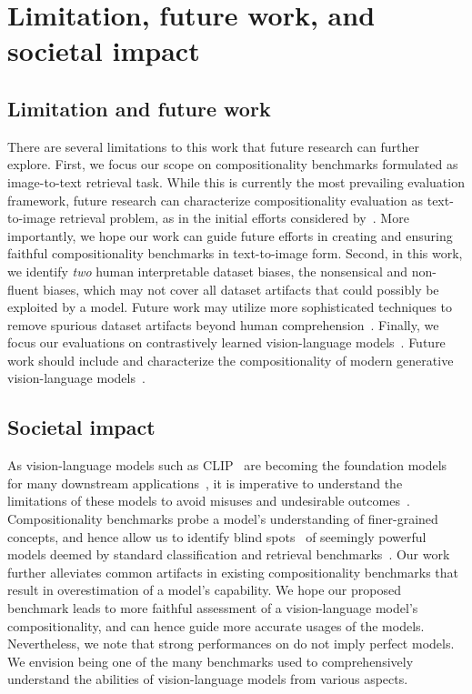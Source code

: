 \section{Limitation, future work, and societal impact}

\subsection{Limitation and future work}
There are several limitations to this work that future research can further explore. First, we focus our scope on compositionality benchmarks formulated as image-to-text retrieval task. While this is currently the most prevailing evaluation framework, future research can characterize compositionality evaluation as text-to-image retrieval problem, as in the initial efforts considered by~\cite{ray2023cola,thrush2022winoground}. More importantly, we hope our work can guide future efforts in creating and ensuring faithful compositionality benchmarks in text-to-image form.
Second, in this work, we identify \emph{two} human interpretable dataset biases, the nonsensical and non-fluent biases, which may not cover all dataset artifacts that could possibly be exploited by a model. Future work may utilize more sophisticated techniques to remove spurious dataset artifacts beyond human comprehension~\cite{le2020adversarial}.
Finally, we focus our evaluations on contrastively learned vision-language models~\cite{RadfordKHRGASAM21}. Future work should include and characterize the compositionality of modern generative vision-language models~\cite{alayrac2022flamingo,chen2022pali,li2023blip2,tschannen2023image}.


\subsection{Societal impact}
As vision-language models such as CLIP~\cite{RadfordKHRGASAM21} are becoming the foundation models for many downstream applications~\cite{rombach2022high,ramesh2022hierarchical}, it is imperative to understand the limitations of these models to avoid misuses and undesirable outcomes~\cite{cho2022dall,bianchi2022easily}. Compositionality benchmarks probe a model's understanding of finer-grained concepts, and hence allow us to identify blind spots~\cite{yuksekgonul2023when,zhao2022vl,ma2022crepe} of seemingly powerful models deemed by standard classification and retrieval benchmarks~\cite{Deng2009ImageNetAL,lin2014microsoft}.
Our work further alleviates common artifacts in existing compositionality benchmarks that result in overestimation of a model's capability. We hope our proposed benchmark \method leads to more faithful assessment of a vision-language model's compositionality, and can hence guide more accurate usages of the models.
Nevertheless, we note that strong performances on \method do not imply perfect models. We envision \method being one of the many benchmarks used to comprehensively understand the abilities of vision-language models from various aspects.




